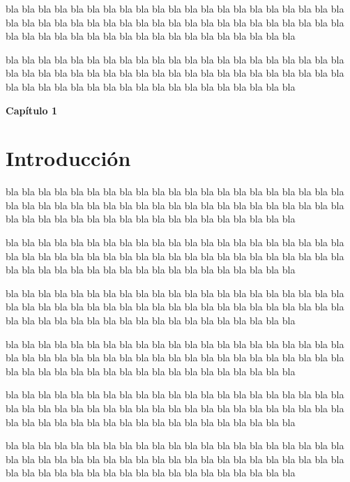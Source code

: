 \documentclass[12pt]{article}
\begin{document}
\vspace*{0.3cm}
bla bla bla bla bla bla bla bla bla bla bla bla bla bla bla bla bla bla bla bla bla bla bla bla bla bla bla bla bla bla bla bla bla bla bla bla bla bla bla bla bla bla bla bla bla bla bla bla bla bla bla bla bla bla bla bla bla bla bla bla

bla bla bla bla bla bla bla bla bla bla bla bla bla bla bla bla bla bla bla bla bla bla bla bla bla bla bla bla bla bla bla bla bla bla bla bla bla bla bla bla bla bla bla bla bla bla bla bla bla bla bla bla bla bla bla bla bla bla bla bla
\newpage


{\huge \bf Capítulo 1}
\section{\Large Introducción}


\vspace*{0.3cm}
bla bla bla bla bla bla bla bla bla bla bla bla bla bla bla bla bla bla bla bla bla bla bla bla bla bla bla bla bla bla bla bla bla bla bla bla bla bla bla bla bla bla bla bla bla bla bla bla bla bla bla bla bla bla bla bla bla bla bla bla
 

\vspace*{0.3cm}
bla bla bla bla bla bla bla bla bla bla bla bla bla bla bla bla bla bla bla bla bla bla bla bla bla bla bla bla bla bla bla bla bla bla bla bla bla bla bla bla bla bla bla bla bla bla bla bla bla bla bla bla bla bla bla bla bla bla bla bla

bla bla bla bla bla bla bla bla bla bla bla bla bla bla bla bla bla bla bla bla bla bla bla bla bla bla bla bla bla bla bla bla bla bla bla bla bla bla bla bla bla bla bla bla bla bla bla bla bla bla bla bla bla bla bla bla bla bla bla bla
\vspace*{0.3cm}

\vspace*{0.3cm}
bla bla bla bla bla bla bla bla bla bla bla bla bla bla bla bla bla bla bla bla bla bla bla bla bla bla bla bla bla bla bla bla bla bla bla bla bla bla bla bla bla bla bla bla bla bla bla bla bla bla bla bla bla bla bla bla bla bla bla bla
 

\vspace*{0.3cm}
bla bla bla bla bla bla bla bla bla bla bla bla bla bla bla bla bla bla bla bla bla bla bla bla bla bla bla bla bla bla bla bla bla bla bla bla bla bla bla bla bla bla bla bla bla bla bla bla bla bla bla bla bla bla bla bla bla bla bla bla

bla bla bla bla bla bla bla bla bla bla bla bla bla bla bla bla bla bla bla bla bla bla bla bla bla bla bla bla bla bla bla bla bla bla bla bla bla bla bla bla bla bla bla bla bla bla bla bla bla bla bla bla bla bla bla bla bla bla bla bla
\vspace*{0.3cm}
\end{document}
